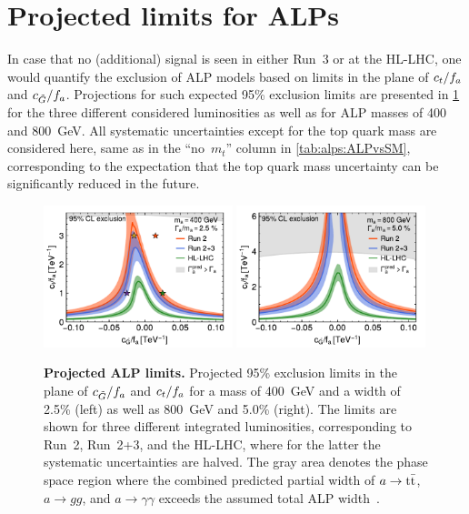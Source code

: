 \section{Projected limits for ALPs}
\label{sec:alps:limits}

In case that no (additional) signal is seen in either Run~3 or at the HL-LHC, one would quantify the exclusion of ALP models based on limits in the plane of $c_t/f_a$ and $c_{\tilde{G}}/f_a$. Projections for such expected 95\% exclusion limits are presented in \cref{fig:alps:limits} for the three different considered luminosities as well as for ALP masses of 400 and 800~GeV. All systematic uncertainties except for the top quark mass are considered here, same as in the ``no~$m_t$'' column in \cref{tab:alps:ALPvsSM}, corresponding to the expectation that the top quark mass uncertainty can be significantly reduced in the future.

\begin{figure}[t]
    \centering
    \includegraphics[width=0.49\textwidth]{figures/alps/limits_m400_w2p5_notmass_small_width.pdf}
    \hfill
    \includegraphics[width=0.49\textwidth]{figures/alps/limits_m800_w5p0_notmass_small.pdf}
    \caption{
        \textbf{Projected ALP limits.} Projected 95\% exclusion limits in the plane of $c_{\tilde{G}}/f_a$ and $c_t/f_a$ for a mass of \SI{400}{\GeV} and a width of 2.5\% (left) as well as \SI{800}{\GeV} and 5.0\% (right). The limits are shown for three different integrated luminosities, corresponding to Run~2, Run~2+3, and the HL-LHC, where for the latter the systematic uncertainties are halved. The gray area denotes the phase space region where the combined predicted partial width of $a \rightarrow \mathrm{t \bar{t}}$, $a \rightarrow gg$, and $a \rightarrow \gamma\gamma$ exceeds the assumed total ALP width~\cite{Jeppe:2024sxt}.
    }
    \label{fig:alps:limits}
\end{figure}

